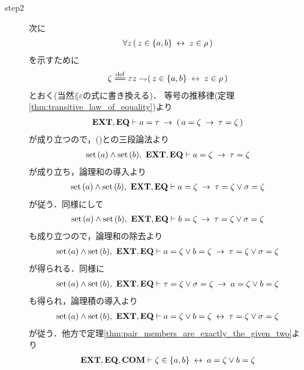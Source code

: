 \begin{sketch}
\begin{description}
			\item[step2]
				次に
				\begin{align}
					\forall z\, (\, z \in \{a,b\} \lrarrow z \in \rho\, )
				\end{align}
				を示すために
				\begin{align}
					\zeta \defeq \varepsilon z \negation (\, z \in \{a,b\} \lrarrow z \in \rho\, )
				\end{align}
				とおく(当然$\lang{\varepsilon}$の式に書き換える)．
				等号の推移律(定理\ref{thm:transitive_law_of_equality})より
				\begin{align}
					\EXTAX,\EQAX \vdash a = \tau \rarrow (\, a = \zeta \rarrow \tau = \zeta\, )
				\end{align}
				が成り立つので，()との三段論法より
				\begin{align}
					\set{a} \wedge \set{b},\ \EXTAX,\EQAX \vdash 
					a = \zeta \rarrow \tau = \zeta
				\end{align}
				が成り立ち，論理和の導入より
				\begin{align}
					\set{a} \wedge \set{b},\ \EXTAX,\EQAX \vdash 
					a = \zeta \rarrow \tau = \zeta \vee \sigma = \zeta
				\end{align}
				が従う．同様にして
				\begin{align}
					\set{a} \wedge \set{b},\ \EXTAX,\EQAX \vdash 
					b = \zeta \rarrow \tau = \zeta \vee \sigma = \zeta
				\end{align}
				も成り立つので，論理和の除去より
				\begin{align}
					\set{a} \wedge \set{b},\ \EXTAX,\EQAX \vdash 
					a = \zeta \vee b = \zeta \rarrow \tau = \zeta \vee \sigma = \zeta
				\end{align}
				が得られる．同様に
				\begin{align}
					\set{a} \wedge \set{b},\ \EXTAX,\EQAX \vdash 
					\tau = \zeta \vee \sigma = \zeta \rarrow a = \zeta \vee b = \zeta
				\end{align}
				も得られ，論理積の導入より
				\begin{align}
					\set{a} \wedge \set{b},\ \EXTAX,\EQAX \vdash 
					a = \zeta \vee b = \zeta \lrarrow \tau = \zeta \vee \sigma = \zeta
				\end{align}
				が従う．他方で定理\ref{thm:pair_members_are_exactly_the_given_two}より
				\begin{align}
					\EXTAX,\EQAX,\COMAX \vdash 
					\zeta \in \{a,b\} \lrarrow a = \zeta \vee b = \zeta
				\end{align}

\end{description}
\end{sketch}
